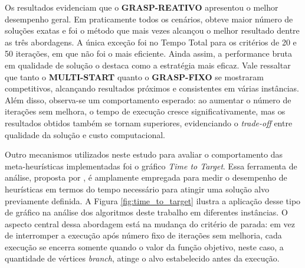 Os resultados evidenciam que o \textbf{GRASP-REATIVO} apresentou o melhor desempenho geral. Em praticamente todos os cenários, obteve maior número de soluções exatas e foi o método que mais vezes alcançou o melhor resultado dentre as três abordagens. A única exceção foi no Tempo Total para os critérios de 20 e 50 iterações, em que não foi o mais eficiente. Ainda assim, a performance bruta em qualidade de solução o destaca como a estratégia mais eficaz. Vale ressaltar que tanto o \textbf{MULTI-START} quanto o \textbf{GRASP-FIXO} se mostraram competitivos, alcançando resultados próximos e consistentes em várias instâncias. Além disso, observa-se um comportamento esperado: ao aumentar o número de iterações sem melhora, o tempo de execução cresce significativamente, mas os resultados obtidos também se tornam superiores, evidenciando o \textit{trade-off} entre qualidade da solução e custo computacional.

Outro mecanismos utilizados neste estudo para avaliar o comportamento das meta-heurísticas implementadas foi o gráfico \textit{Time to Target}. Essa ferramenta de análise, proposta por \cite{timetotarget2002}, é amplamente empregada para medir o desempenho de heurísticas em termos do tempo necessário para atingir uma solução alvo previamente definida. A Figura \ref{fig:time_to_target} ilustra a aplicação desse tipo de gráfico na análise dos algoritmos deste trabalho em diferentes instâncias. O aspecto central dessa abordagem está na mudança do critério de parada: em vez de interromper a execução após número fixo de iterações sem melhoria, cada execução se encerra somente quando o valor da função objetivo, neste caso, a quantidade de vértices \textit{branch}, atinge o alvo estabelecido antes da execução.

